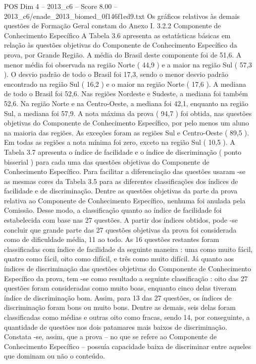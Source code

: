 \begin{textsample}{POS Dim 4 – 2013\_c6 – Score 8.00 – 2013\_c6/enade\_2013\_biomed\_0f146f1ed9.txt}
Os gráficos relativos às demais questões de Formação Geral constam do Anexo I. 3.2.2 Componente de Conhecimento Específico A Tabela 3.6 apresenta as estatísticas básicas em relação às questões objetivas do Componente de Conhecimento Específico da prova, por Grande Região.
A média do Brasil deste componente foi de 51,6.
A menor média foi observada na região Norte ( 44,9 ) e a maior na região Sul ( 57,3 ).
O desvio padrão de todo o Brasil foi 17,3, sendo o menor desvio padrão encontrado na região Sul ( 16,2 ) e o maior na região Norte ( 17,6 ).
A mediana de todo o Brasil foi 52,6.
Nas regiões Nordeste e Sudeste, a mediana foi também 52,6.
Na região Norte e na Centro-Oeste, a mediana foi 42,1, enquanto na região Sul, a mediana foi 57,9.
A nota máxima da prova ( 94,7 ) foi obtida, nas questões objetivas do Componente de Conhecimento Específico, por pelo menos um aluno na maioria das regiões.
As exceções foram as regiões Sul e Centro-Oeste ( 89,5 ).
Em todas as regiões a nota mínima foi zero, exceto na região Sul ( 10,5 ).
A Tabela 3.7 apresenta o índice de facilidade e o índice de discriminação ( ponto bisserial ) para cada uma das questões objetivas do Componente de Conhecimento Específico.
Para facilitar a diferenciação das questões usaram -se as mesmas cores da Tabela 3.5 para as diferentes classificações dos índices de facilidade e de discriminação.
Dentre as questões objetivas da parte da prova relativa ao Componente de Conhecimento Específico, nenhuma foi anulada pela Comissão.
Desse modo, a classificação quanto ao índice de facilidade foi estabelecida com base nas 27 questões.
A partir dos índices obtidos, pode -se concluir que grande parte das 27 questões objetivas da prova foi considerada como de dificuldade média, 11 ao todo.
As 16 questões restantes foram classificadas com índice de facilidade da seguinte maneira : uma como muito fácil, quatro como fácil, oito como difícil, e três como muito difícil.
Já quanto aos índices de discriminação das questões objetivas do Componente de Conhecimento Específico da prova, tem -se como resultado a seguinte classificação : oito das 27 questões foram consideradas como muito boas, enquanto cinco delas tiveram índice de discriminação bom.
Assim, para 13 das 27 questões, os índices de discriminação foram bons ou muito bons.
Dentre as demais, seis delas foram classificadas como médias e outras oito como fracas, sendo 14, por conseguinte, a quantidade de questões nos dois patamares mais baixos de discriminação.
Constata -se, assim, que a prova – no que se refere ao Componente de Conhecimento Específico – possuía capacidade baixa de discriminar entre aqueles que dominam ou não o conteúdo.

\end{textsample}
